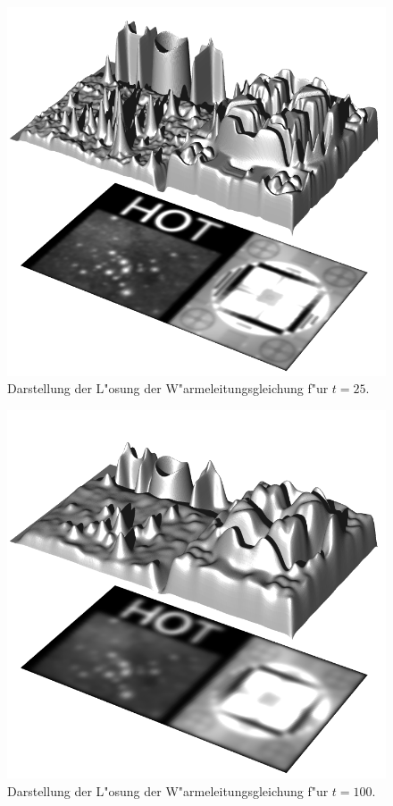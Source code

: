 \begin{figure}
\begin{center}
\includegraphics[width=\hsize]{heat/heat-i00025.png}
\end{center}
\caption{Darstellung der L"osung der W"armeleitungsgleichung
f"ur $t=25$.
\label{heat:t25}}
\end{figure}
%
\begin{figure}
\begin{center}
\includegraphics[width=\hsize]{heat/heat-i00100.png}
\end{center}
\caption{Darstellung der L"osung der W"armeleitungsgleichung
f"ur $t=100$.
\label{heat:t100}}
\end{figure}
